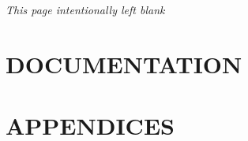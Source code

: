 \documentclass[a4paper,14.50pt]{book} \usepackage{color} \usepackage[usenames,dvipsnames,svgnames,table,x11names]{xcolor}
\makeatletter
\def\cleardoublepage{\clearpage%
        \if@twoside
            \ifodd\c@page\else
                \vspace*{\fill}
                \hfill
                \begin{center}
                \emph{This page intentionally left blank}
                \end{center}
                \vspace{\fill}
                \thispagestyle{empty}
                \newpage
                \if@twocolumn\hbox{}\newpage\fi
            \fi
        \fi
    }
\makeatother
\begin{document}
\cleardoublepage

\renewcommand{\headrulewidth}{0.2pt}

\part{DOCUMENTATION}


%
%
%
%
%
%
%


\part{APPENDICES}
\appendix
%

\printglossary
\printindex
\end{document}
